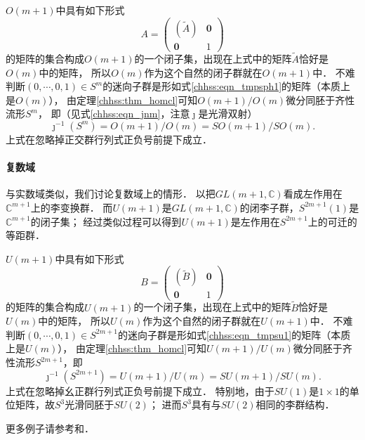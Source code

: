 $O(m+1)$中具有如下形式
\begin{equation}\label{chhss:eqn_tmpsph1}
    A=\begin{pmatrix}
        (\tilde{A}) & \boldsymbol{0} \\ \boldsymbol{0} & 1
    \end{pmatrix}
\end{equation}
的矩阵的集合构成$O(m+1)$的一个闭子集，出现在上式中的矩阵$\tilde{A}$恰好是$O(m)$中的矩阵，
所以$O(m)$作为这个自然的闭子群就在$O(m+1)$中．
不难判断$(0,\cdots,0,1)\in S^m$的迷向子群是形如式\eqref{chhss:eqn_tmpsph1}的矩阵（本质上是$O(m)$），
由定理\ref{chhss:thm_homcl}可知$O(m+1)/O(m)$微分同胚于齐性流形$S^m$，
即（见式\eqref{chhss:eqn_jnm}，注意$\jmath$是光滑双射）
\begin{equation}
    \jmath^{-1} (S^m)=O(m+1)/O(m)=SO(m+1)/SO(m).
\end{equation}
上式在忽略掉正交群行列式正负号前提下成立．


\paragraph{复数域}
与实数域类似，我们讨论复数域上的情形．
以把$GL(m+1,\mathbb{C})$看成左作用在$\mathbb{C}^{m+1}$上的李变换群．
而$U(m+1)$是$GL(m+1,\mathbb{C})$的闭李子群，$S^{2m+1}(1)$是$\mathbb{C}^{m+1}$的闭子集；
经过类似过程可以得到$U(m+1)$是左作用在$S^{2m+1}$上的可迁的等距群．

$U(m+1)$中具有如下形式
\begin{equation}\label{chhss:eqn_tmpsu1}
    B=\begin{pmatrix}
        (\tilde{B}) & \boldsymbol{0} \\ \boldsymbol{0} & 1
    \end{pmatrix}
\end{equation}
的矩阵的集合构成$U(m+1)$的一个闭子集，出现在上式中的矩阵$\tilde{B}$恰好是$U(m)$中的矩阵，
所以$U(m)$作为这个自然的闭子群就在$U(m+1)$中．
不难判断$(0,\cdots,0,1)\in S^{2m+1}$的迷向子群是形如式\eqref{chhss:eqn_tmpsu1}的矩阵（本质上是$U(m)$），
由定理\ref{chhss:thm_homcl}可知$U(m+1)/U(m)$微分同胚于齐性流形$S^{2m+1}$，即
\begin{equation}
    \jmath^{-1} (S^{2m+1})=U(m+1)/U(m)=SU(m+1)/SU(m).
\end{equation}
上式在忽略掉幺正群行列式正负号前提下成立．
特别地，由于$SU(1)$是$1\times 1$的单位矩阵，故$S^3$光滑同胚于$SU(2)$；
进而$S^3$具有与$SU(2)$相同的李群结构．



更多例子请参考\parencite[\S 11.14-11.20]{oneill1983}和\parencite[3.65]{warner-1983-FDMLG}．






